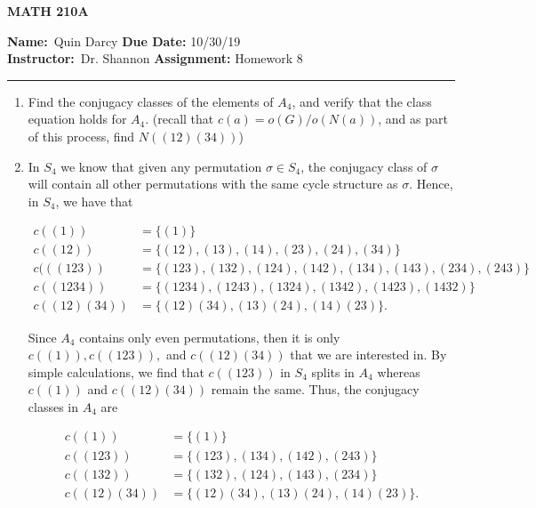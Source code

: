 \documentclass[12pt]{article}
\makeatletter
\theoremstyle{definition}
\theoremstyle{remark}
\newenvironment{solution}[1][\bf{\textit{Solution}}]{\par
  
  \normalfont \topsep6\p@\@plus6\p@\relax
  \list{}{\leftmargin=0mm
          \rightmargin=0mm
          \settowidth{\itemindent}{\itshape#1}%
          \labelwidth=\itemindent
          \parsep=0pt \listparindent=\parindent 
  }
  \item[\hskip\labelsep
        \itshape
    #1\@addpunct{.}]\ignorespaces
}{%
  \popQED\endlist\@endpefalse
}
\makeatother
\begin{document}
\begin{center}
	\vspace{.4cm} {\textbf { \large MATH 210A}}
\end{center}
{\textbf{Name:}\ Quin Darcy \hspace{\fill} \textbf{Due Date:} 10/30/19   \\
{ \textbf{Instructor:}}\ Dr. Shannon \hspace{\fill} \textbf{Assignment:} Homework 8 \\ \hrule}

\justifying

    \begin{enumerate}[leftmargin=*]
        \item Find the conjugacy classes of the elements of $A_4$, and verify that the class equation holds for $A_4$. (recall that $c(a)=o(G)/o(N(a))$, and as part of this process, find $N((12)(34))$)
            \begin{solution}
                In $S_4$ we know that given any permutation $\sigma\in S_4$, the conjugacy class of $\sigma$ will contain all other permutations with the same cycle structure as $\sigma$. Hence, in $S_4$, we have that 
                
                \begin{equation*}
                    \begin{split}
                        c((1))&=\{(1)\} \\
                        c((12))&=\{(12),(13),(14),(23),(24),(34)\} \\
                        c(((123))&=\{(123),(132),(124),(142),(134),(143),(234),(243)\} \\
                        c((1234))&=\{(1234),(1243),(1324),(1342),(1423),(1432)\} \\
                        c((12)(34))&=\{(12)(34),(13)(24),(14)(23)\}.
                    \end{split}
                \end{equation*}
                
                Since $A_4$ contains only even permutations, then it is only $c((1)),c((123)),$ and $c((12)(34))$ that we are interested in. By simple calculations, we find that $c((123))$ in $S_4$ splits in $A_4$ whereas $c((1))$ and $c((12)(34))$ remain the same. Thus, the conjugacy classes in $A_4$ are 
                
                \begin{equation*}
                    \begin{split}
                        c((1))&=\{(1)\} \\
                        c((123))&=\{(123),(134),(142),(243)\} \\
                        c((132))&=\{(132),(124),(143),(234)\} \\
                        c((12)(34))&=\{(12)(34),(13)(24),(14)(23)\}. 
                    \end{split}
                \end{equation*}
                

\end{solution}
\end{enumerate}
\end{document}

